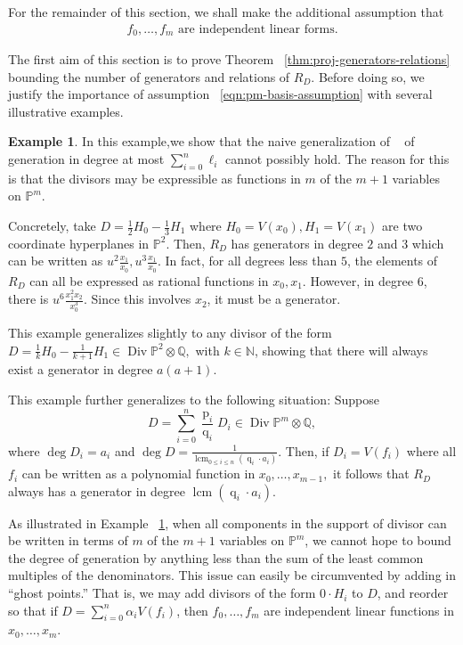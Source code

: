\documentclass{amsart}
\theoremstyle{plain}
\theoremstyle{definition}
\newtheorem{example}[thm]{Example}
\theoremstyle{remark}
\numberwithin{equation}{section}
\newcommand\bn{{\mathbb N}}
\newcommand\bq{{\mathbb Q}}
\newcommand\bp{{\mathbb P}}
\DeclareMathOperator\di{Div}
\newcommand\bida{a}
\DeclareMathOperator{\num}{p}
\DeclareMathOperator{\den}{q}
\DeclareMathOperator{\lcm}{lcm}
\begin{document}
For the remainder of this section, we shall make the additional assumption that 
\begin{align} \label{eqn:pm-basis-assumption} f_0, \ldots, f_{m}
	\text{ are independent linear forms.} \end{align}

The first aim of this section is to prove Theorem
~\ref{thm:proj-generators-relations} bounding the number of generators and
relations of $R_D$. Before doing so, we justify the importance of assumption
~\eqref{eqn:pm-basis-assumption} with several illustrative examples.

\begin{example}
\label{eg:hyperplane}
In this example,we show that the naive generalization of
~\cite[Theorem 8]{dorney:canonical} of generation in degree at most
$\sum_{i=0}^{n}\ell_i$ cannot possibly hold. The reason for this is
that the divisors may be
expressible as functions in $m$ of the $m+1$ variables on $\bp^m$.

Concretely, take $D = \frac{1}{2}H_0 - \frac{1}{3}H_1$ where $H_0 = V(x_0),
H_1 = V(x_1)$ are two coordinate hyperplanes in $\bp^2$. Then, $R_D$
has generators in degree $2$ and $3$ which can be written as $u^2
\frac{x_1}{x_0}, u^3 \frac{x_1}{x_0}.$ In fact, for all degrees
less than $5$, the elements of $R_D$ can all be expressed as
rational functions in $x_0, x_1$. However, in degree $6$, there is
$u^6 \frac{x_1^2 x_2}{x_0^3}$. Since this
involves $x_2$, it must be a generator.

This example generalizes slightly to any divisor of the form $D =
\frac{1}{k}H_0 - \frac{1}{k+1}H_1 \in \di \bp^2 \otimes \bq,$ with
$k \in \bn$, showing that there will always exist a generator in
degree $a(a + 1)$.

This example further generalizes to the following situation:
Suppose 
\[
	D = \sum_{i=0}^{n} \frac{\num_i}{\den_i}D_i \in \di \bp^m
\otimes \bq,
\]
where $\deg D_i = \bida_i$ and $\deg D = \frac{1}{\lcm
_{0 \leq i \leq n}(\den_i \cdot \bida_i)}$. Then, if $D_i = V(f_i)$
where all $f_i$ can be written as a polynomial function in $x_0,
\ldots, x_{m-1},$ it follows that $R_D$ always has a generator in degree
$\lcm(\den_i \cdot \bida_i)$.
\end{example}

As illustrated in Example ~\ref{eg:hyperplane}, 
when all components in the support of divisor can be 
written in terms of $m$ of the $m+1$ variables on $\bp^m$,
we cannot hope to bound the degree of generation
by anything less than the sum of the least common multiples of
the denominators. This issue can easily be circumvented by adding in ``ghost
points.'' That is, we may add divisors of the form $0 \cdot H_i$ to
$D$, and reorder so that if $D = \sum_{i=0}^{n}\alpha_i V(f_i)$,
then $f_0, \ldots, f_m$ are independent linear functions in
$x_0,\ldots, x_m$.
\end{document}
